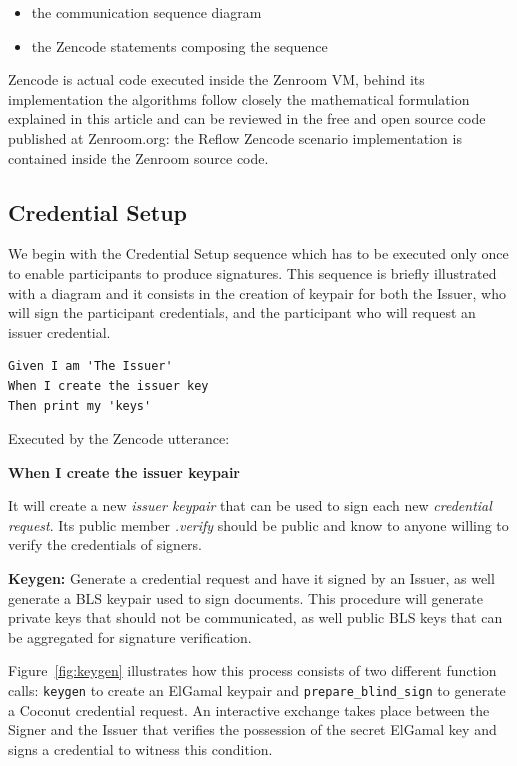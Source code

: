 \documentclass[twocolumn]{article}
\begin{document}
\begin{itemize}
  \item the communication sequence diagram
  \item the Zencode statements composing the sequence 
\end{itemize}

Zencode is actual code executed inside the Zenroom VM, behind its
implementation the algorithms follow closely the mathematical
formulation explained in this article and can be reviewed in the free
and open source code published at Zenroom.org: the Reflow Zencode
scenario implementation is contained inside the Zenroom source
code.

\subsection*{Credential Setup}

We begin with the Credential Setup sequence which has to be executed
only once to enable participants to produce signatures. This sequence is
briefly illustrated with a diagram and it consists in the creation of
keypair for both the Issuer, who will sign the participant credentials,
and the participant who will request an issuer credential.

\begin{lstlisting}[style=zencode,caption={Issuer Keygen}]
Given I am 'The Issuer'
When I create the issuer key
Then print my 'keys'  
\end{lstlisting}

Executed by the Zencode utterance:

\textbf{When I create the issuer keypair}

It will create a new \emph{issuer keypair} that can be used to sign
each new \emph{credential request}. Its public member \emph{.verify}
should be public and know to anyone willing to verify the credentials
of signers.

\textbf{Keygen:} Generate a credential request and have it signed by
an Issuer, as well generate a BLS keypair used to sign documents. This
procedure will generate private keys that should not be communicated,
as well public BLS keys that can be aggregated for signature
verification.

Figure~\ref{fig:keygen} illustrates how this process consists of two
different function calls: \verb!keygen! to create an ElGamal keypair
and \verb!prepare_blind_sign! to generate a Coconut credential
request. An interactive exchange takes place between the Signer and
the Issuer that verifies the possession of the secret ElGamal key and
signs a credential to witness this condition.
\end{document}
